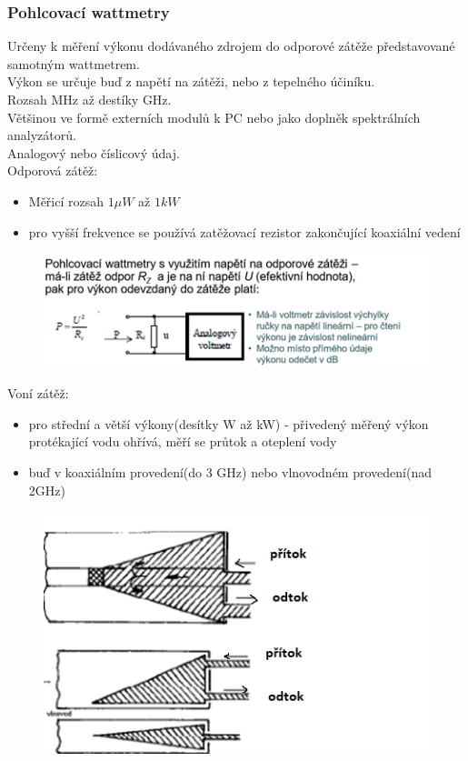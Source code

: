 \subsubsection*{Pohlcovací wattmetry}
Určeny k měření výkonu dodávaného zdrojem do odporové zátěže představované samotným wattmetrem.\\
Výkon se určuje buď z napětí na zátěži, nebo z tepelného účiníku.\\
Rozsah MHz až destíky GHz.\\
Většinou ve formě externích modulů k PC nebo jako doplněk spektrálních analyzátorů.\\
Analogový nebo číslicový údaj.\\
Odporová zátěž:
\begin{itemize}
    \item Měřicí rozsah $1 \mu W$ až $1 kW$
    \item pro vyšší frekvence se používá zatěžovací rezistor zakončující koaxiální vedení
\end{itemize}
\begin{figure}[H]
    \includegraphics*[scale  = 1.3]{images/wattOdporovaZatez.png}
\end{figure}

Voní zátěž:
\begin{itemize}
    \item pro střední a větší výkony(desítky W až kW) - přivedený měřený výkon protékající vodu ohřívá, měří se průtok a oteplení vody 
    \item buď v koaxiálním provedení(do 3 GHz) nebo vlnovodném provedení(nad 2GHz)
\end{itemize}
\begin{figure}[H]
    \includegraphics*[scale  = 1.3]{images/wattVodniZatez.png}
\end{figure}

